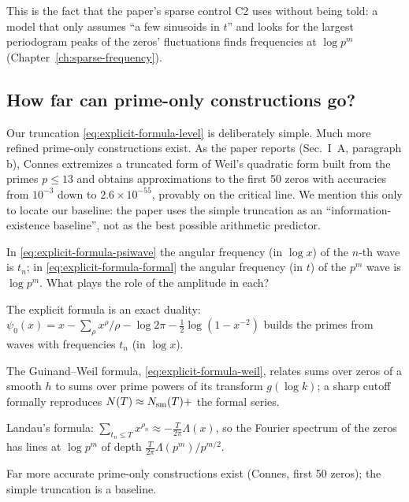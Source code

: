 This is the fact that the paper's sparse control C2 uses without being told: a model that only assumes ``a few sinusoids in $t$'' and looks for the largest periodogram peaks of the zeros' fluctuations finds frequencies at $\log p^m$ (Chapter~\ref{ch:sparse-frequency}).

\subsection{How far can prime-only constructions go?}

Our truncation \cref{eq:explicit-formula-level} is deliberately simple. Much more refined prime-only constructions exist. As the paper reports (Sec.~I~A, paragraph b), Connes \cite{connes26} extremizes a truncated form of Weil's quadratic form built from the primes $p\le13$ and obtains approximations to the first 50 zeros with accuracies from $10^{-3}$ down to $2.6\times10^{-55}$, provably on the critical line. We mention this only to locate our baseline: the paper uses the simple truncation as an ``information-existence baseline'', not as the best possible arithmetic predictor.

\begin{checkpoint}
In \cref{eq:explicit-formula-psiwave} the angular frequency (in $\log x$) of the $n$-th wave is $t_n$; in \cref{eq:explicit-formula-formal} the angular frequency (in $t$) of the $p^m$ wave is $\log p^m$. What plays the role of the amplitude in each?
\end{checkpoint}

\begin{keyideas}
\item The explicit formula is an exact duality: $\psi_0(x)=x-\sum_\rho x^\rho/\rho-\log2\pi-\frac12\log(1-x^{-2})$ builds the primes from waves with frequencies $t_n$ (in $\log x$).
\item The Guinand--Weil formula, \cref{eq:explicit-formula-weil}, relates sums over zeros of a smooth $h$ to sums over prime powers of its transform $g(\log k)$; a sharp cutoff formally reproduces $N(T)\approx N_{\mathrm{sm}}(T)+$ the formal series.
\item Landau's formula: $\sum_{t_n\le T}x^{\rho_n}\approx-\frac{T}{2\pi}\Lambda(x)$, so the Fourier spectrum of the zeros has lines at $\log p^m$ of depth $\frac{T}{2\pi}\Lambda(p^m)/p^{m/2}$.
\item Far more accurate prime-only constructions exist (Connes, first 50 zeros); the simple truncation is a baseline.
\end{keyideas}

